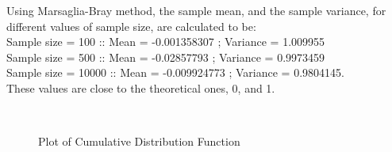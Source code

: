 \documentclass[11pt]{article}
\begin{document}
Using Marsaglia-Bray method, the sample mean, and the sample variance, for different values of sample size, are calculated to be:\\
Sample size = 100	\hspace{10mm}::\hspace{10mm}	Mean = -0.001358307	\hspace{8mm};\hspace{10mm}	Variance = 1.009955\\
Sample size = 500	\hspace{10mm}::\hspace{10mm}	Mean = -0.02857793	\hspace{10mm};\hspace{10mm}	Variance = 0.9973459\\
Sample size = 10000	\hspace{6mm}::\hspace{10mm}		Mean = -0.009924773	\hspace{8mm};\hspace{10mm}	Variance = 0.9804145.\\
These values are close to the theoretical ones, 0, and 1.\\

\begin{figure}[H]
	\centering
	\\
		\caption{Plot of Cumulative Distribution Function}
\end{figure}
\end{document}
